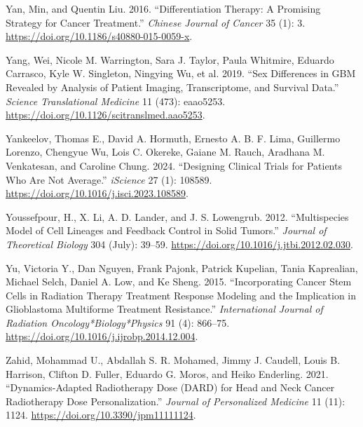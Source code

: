 \documentclass[
  default,
]{sn-jnl}
\newlength{\cslhangindent}
\newenvironment{CSLReferences}[2] %
 {\begin{list}{}{%
  \setlength{\itemindent}{0pt}
  \setlength{\leftmargin}{0pt}
  \setlength{\parsep}{0pt}
  \ifodd #1
   \setlength{\leftmargin}{\cslhangindent}
   \setlength{\itemindent}{-1\cslhangindent}
  \fi
  \setlength{\itemsep}{#2\baselineskip}}}
 {\end{list}}
\begin{document}
\begin{CSLReferences}{1}{0}
Yan, Min, and Quentin Liu. 2016. {``Differentiation Therapy: A Promising
Strategy for Cancer Treatment.''} \emph{Chinese Journal of Cancer} 35
(1): 3. \url{https://doi.org/10.1186/s40880-015-0059-x}.

Yang, Wei, Nicole M. Warrington, Sara J. Taylor, Paula Whitmire, Eduardo
Carrasco, Kyle W. Singleton, Ningying Wu, et al. 2019. {``Sex
Differences in GBM Revealed by Analysis of Patient Imaging,
Transcriptome, and Survival Data.''} \emph{Science Translational
Medicine} 11 (473): eaao5253.
\url{https://doi.org/10.1126/scitranslmed.aao5253}.

Yankeelov, Thomas E., David A. Hormuth, Ernesto A. B. F. Lima, Guillermo
Lorenzo, Chengyue Wu, Lois C. Okereke, Gaiane M. Rauch, Aradhana M.
Venkatesan, and Caroline Chung. 2024. {``Designing Clinical Trials for
Patients Who Are Not Average.''} \emph{iScience} 27 (1): 108589.
\url{https://doi.org/10.1016/j.isci.2023.108589}.

Youssefpour, H., X. Li, A. D. Lander, and J. S. Lowengrub. 2012.
{``Multispecies Model of Cell Lineages and Feedback Control in Solid
Tumors.''} \emph{Journal of Theoretical Biology} 304 (July): 39--59.
\url{https://doi.org/10.1016/j.jtbi.2012.02.030}.

Yu, Victoria Y., Dan Nguyen, Frank Pajonk, Patrick Kupelian, Tania
Kaprealian, Michael Selch, Daniel A. Low, and Ke Sheng. 2015.
{``Incorporating Cancer Stem Cells in Radiation Therapy Treatment
Response Modeling and the Implication in Glioblastoma Multiforme
Treatment Resistance.''} \emph{International Journal of Radiation
Oncology*Biology*Physics} 91 (4): 866--75.
\url{https://doi.org/10.1016/j.ijrobp.2014.12.004}.

Zahid, Mohammad U., Abdallah S. R. Mohamed, Jimmy J. Caudell, Louis B.
Harrison, Clifton D. Fuller, Eduardo G. Moros, and Heiko Enderling.
2021. {``Dynamics-Adapted Radiotherapy Dose (DARD) for Head and Neck
Cancer Radiotherapy Dose Personalization.''} \emph{Journal of
Personalized Medicine} 11 (11): 1124.
\url{https://doi.org/10.3390/jpm11111124}.

\end{CSLReferences}
\end{document}
